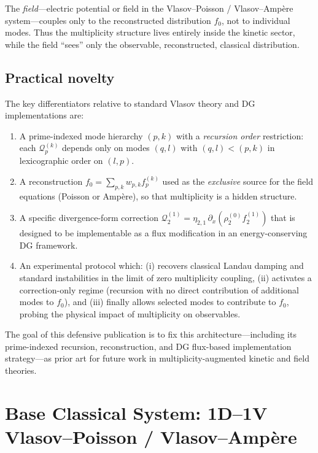 \documentclass[11pt]{article}
\begin{document}
The \emph{field}---electric potential or field in the Vlasov--Poisson /
Vlasov--Amp\`ere system---couples only to the reconstructed distribution
$f_0$, not to individual modes. Thus the multiplicity structure lives entirely
inside the kinetic sector, while the field ``sees'' only the observable,
reconstructed, classical distribution.

\subsection{Practical novelty}

The key differentiators relative to standard Vlasov theory and DG
implementations are:
\begin{enumerate}
  \item A prime-indexed mode hierarchy $(p,k)$ with a \emph{recursion order}
        restriction: each $\mathcal{Q}_p^{(k)}$ depends only on modes
        $(q,l)$ with $(q,l) < (p,k)$ in lexicographic order on $(l,p)$.
  \item A reconstruction $f_0 = \sum_{p,k} w_{p,k} f_p^{(k)}$ 
        used as the \emph{exclusive} source for the field equations
        (Poisson or Amp\`ere), so that multiplicity is a hidden structure.
  \item A specific divergence-form correction 
        $\mathcal{Q}_2^{(1)} = \eta_{2,1}\,\partial_x(\rho_2^{(0)} f_2^{(1)})$
        that is designed to be implementable as a flux modification in an
        energy-conserving DG framework.
  \item An experimental protocol which:
        (i) recovers classical Landau damping and standard instabilities in the
        limit of zero multiplicity coupling,
        (ii) activates a correction-only regime (recursion with no direct
        contribution of additional modes to $f_0$),
        and (iii) finally allows selected modes to contribute to $f_0$,
        probing the physical impact of multiplicity on observables.
\end{enumerate}

The goal of this defensive publication is to fix this architecture---including
its prime-indexed recursion, reconstruction, and DG flux-based implementation
strategy---as prior art for future work in multiplicity-augmented kinetic and
field theories.

\section{Base Classical System: 1D--1V Vlasov--Poisson / Vlasov--Amp\`ere}
\end{document}
